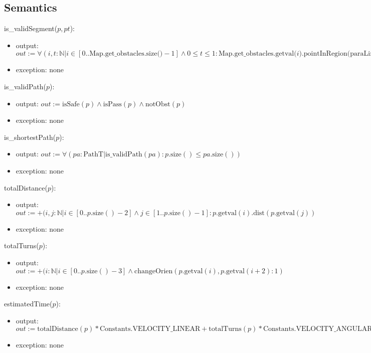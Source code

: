 \documentclass[12pt]{article}
\begin{document}
\subsection* {Semantics}

\noindent is\_validSegment($p, pt$):
\begin{itemize}
\item output: 
\newline $out:= \forall ( i,t : \mathbb{N} | i \in [0 .. \mbox{Map.get\_obstacles.size()}-1] \wedge 0 \leq t \leq 1: \mbox{Map.get\_obstacles.getval(}i\mbox{).pointInRegion(paraLinePt}(p,pt,t))$
\item exception: none
\end{itemize}

\noindent is\_validPath($p$):
\begin{itemize}
\item output: $out:= \mbox{isSafe}(p) \wedge \mbox{isPass}(p) \wedge \mbox{notObst}(p)$
\item exception: none
\end{itemize}

\noindent is\_shortestPath($p$):
\begin{itemize}
\item output: $out:= \forall (pa: \mbox{PathT} | \mbox{is\_validPath}(pa) : p.\mbox{size}() \leq pa.\mbox{size}())$
\item exception: none
\end{itemize}

\noindent totalDistance($p$):
\begin{itemize}
\item output: $out:= +(i, j : \mathbb{N} | i \in [0.. p.\mbox{size}()-2] \wedge j \in [1 .. p.\mbox{size}()-1] : p.\mbox{getval}(i).\mbox{dist}(p.\mbox{getval}(j))$
\item exception: none
\end{itemize}

\noindent totalTurns($p$):
\begin{itemize}
\item output: $out:= +(i : \mathbb{N} | i \in [0 .. p.\mbox{size}()-3]\wedge \mbox{changeOrien} (p.\mbox{getval}(i),p.\mbox{getval}(i+2) : 1)$
\item exception: none
\end{itemize}

\noindent estimatedTime($p$):
\begin{itemize}
\item output: $out:= \mbox{totalDistance}(p) * \mbox{Constants.VELOCITY\_LINEAR} + \mbox{totalTurns}(p) * \mbox{Constants.VELOCITY\_ANGULAR}$
\item exception: none
\end{itemize}
\end{document}
